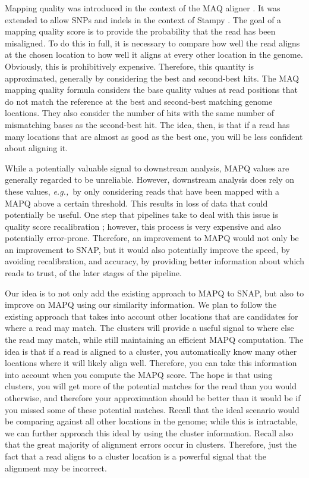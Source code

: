\documentclass[twocolumn,10pt]{article}
\newcommand{\eg}{{\em e.g.,}~}
\begin{document}
Mapping quality was introduced in the context of the MAQ aligner \cite{Li:2008}.  It was extended to allow SNPs and indels in the context of Stampy \cite{Lunter:2011}.  The goal of a mapping quality score is to provide the probability that the read has been misaligned.  To do this in full, it is necessary to compare how well the read aligns at the chosen location to how well it aligns at every other location in the genome.  Obviously, this is prohibitively expensive.  Therefore, this quantity is approximated, generally by considering the best and second-best hits.  The MAQ mapping quality formula considers the base quality values at read positions that do not match the reference at the best and second-best matching genome locations.  They also consider the number of hits with the same number of mismatching bases as the second-best hit.  The idea, then, is that if a read has many locations that are almost as good as the best one, you will be less confident about aligning it.

While a potentially valuable signal to downstream analysis, MAPQ values are generally regarded to be unreliable.  However, downstream analysis does rely on these values, \eg by only considering reads that have been mapped with a MAPQ above a certain threshold.  This results in loss of data that could potentially be useful.  One step that pipelines take to deal with this issue is quality score recalibration \cite{DePristo:2011}; however, this process is very expensive and also potentially error-prone.  Therefore, an improvement to MAPQ would not only be an improvement to SNAP, but it would also potentially improve the speed, by avoiding recalibration, and accuracy, by providing better information about which reads to trust, of the later stages of the pipeline.

Our idea is to not only add the existing approach to MAPQ to SNAP, but also to improve on MAPQ using our similarity information.  We plan to follow the existing approach that takes into account other locations that are candidates for where a read may match.  The clusters will provide a useful signal to where else the read may match, while still maintaining an efficient MAPQ computation.  The idea is that if a read is aligned to a cluster, you automatically know many other locations where it will likely align well.  Therefore, you can take this information into account when you compute the MAPQ score.  The hope is that using clusters, you will get more of the potential matches for the read than you would otherwise, and therefore your approximation should be better than it would be if you missed some of these potential matches.  Recall that the ideal scenario would be comparing against all other locations in the genome; while this is intractable, we can further approach this ideal by using the cluster information.  Recall also that the great majority of alignment errors occur in clusters.  Therefore, just the fact that a read aligns to a cluster location is a powerful signal that the alignment may be incorrect.
\end{document}
